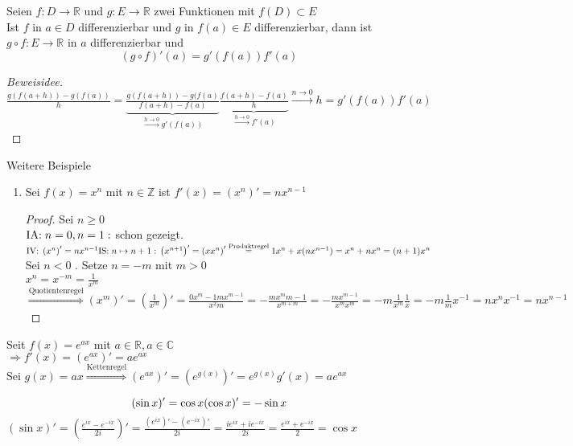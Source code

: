 \documentclass[a4paper,titlepage,oneside]{article}
\def\C{\ensuremath{\mathbb{C}} }
\def\Z{\ensuremath{\mathbb{Z}} }
\def\R{\ensuremath{\mathbb{R}} }
\def\im{\ensuremath{\mathit{i}} }
\def\e{\ensuremath{\mathit{e}} }
\newcommand{\IA}[1][n=0]{\vspace{0.1pt}\ensuremath{\text{IA:}\sp#1:}}
\newcommand{\IV}{\vspace{0.1pt}\ensuremath{\text{IV:}\sp}}
\newcommand{\IS}[1][n \mapsto n+1]{\vspace{0.1pt}\ensuremath{\text{IS:}\sp#1:}}
\def\sp{\hspace{0,1cm}}
\newcommand{\longtonull}[1][n]{\ensuremath{\overset{\scriptscriptstyle{#1 \to 0}}{\longrightarrow}}}
\theoremstyle{thmstyle}
\begin{document}
\begin{satz}[Kettenregel]
Seien $f: D \to \R$ und $g : E \to \R$ zwei Funktionen mit $f(D) \subset E$\\
Ist $f$ in $a \in D$ differenzierbar und $g$ in $f(a) \in E$ differenzierbar, dann ist $g \circ f : E \to \R $ in $a$ differenzierbar und \[ \left(g \circ f\right)'(a) = g'(f(a)) f'(a)\]
\begin{proof}[Beweisidee]
$\frac{g(f(a+h)) - g(f(a))}{h} = \underbrace{\frac{g(f(a+h)) - g(f(a)}{f(a+h)-f(a)}}_{\longtonull[h] g'(f(a))} \underbrace{\frac{f(a+h) - f(a)}{h}}_{\longtonull[h] f'(a)} \longtonull{h} = g'(f(a))f'(a)$
\end{proof}
\end{satz}

\begin{bsp} Weitere Beispiele
\begin{enumerate}
\item Sei $f(x) = x^n$ mit $n \in \Z$ ist $f'(x) = \left(x^n\right)' = n x^{n-1}$
\begin{proof} Sei $n \ge 0$ \\
$\IA[n=0, n=1] $ schon gezeigt.\\
$\IV \left(x^n\right)' = n x^{n-1}\\
\IS \\
\left(x^{n+1}\right)' = \left(x x^n\right)' \overset{\text{Produktregel}}{=} 1 x^n + x (n x^{n-1}) = x^n + n x^n = (n+1) x^n$\\
Sei $n < 0$ . Setze $n = -m$ mit $m > 0$\\
$x^n = x^{-m} = \frac{1}{x^m}$
$\overset{\text{Quotientenregel}}{\Rightarrow} \left(x^m\right)' = \left(\frac{1}{x^m}\right)' = \frac{0 x^m - 1 m x^{m-1}}{x^2m} = - \frac{m x^m{m-1}}{x^{m+m}} = - \frac{mx^{m-1}}{x^mx^m} = -m \frac{1}{x^m}\frac{1}{x} = - m \frac{1}{m} x^{-1} = n x^n x^{-1} = n x^{n-1}$
\end{proof}
\end{enumerate}
\item Seit $f(x) = \e^{ax}$ mit $a \in \R , a \in \C$\\
$\Rightarrow f'(x) = (\e^{ax})' = a \e^{ax}$\\
Sei $g(x) = ax \overset{\text{Kettenregel}}{\Rightarrow}  (\e^{ax})' =  (\e^{g(x)})' =  \e^{g(x)}g'(x) =  a \e^{ax}$
\item \[(\sin x)' = \cos x \\ (\cos x)' = - \sin x\]
$\displaystyle (\sin x)' = \left( \frac{\e^{\im x} - \e^{-\im x}}{2\im}\right)' = \frac{(\e^{\im x})' - (\e^{-\im x})'}{2\im} = \frac{\im \e^{\im x} + \im \e^{-\im x}}{2\im} = \frac{\e^{\im x} + \e^{-\im x}}{2} = \cos x $\\

\end{bsp}
\end{document}
